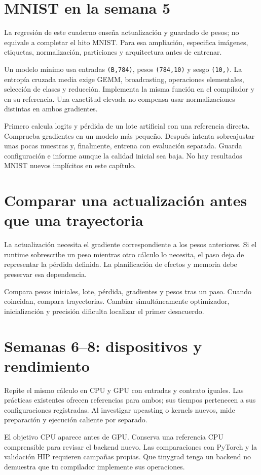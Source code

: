 \documentclass[12pt,a4paper,oneside]{report}
\begin{document}
\section{MNIST en la semana 5}
La regresión de este cuaderno enseña actualización y guardado de pesos; no equivale a completar el hito MNIST. Para esa ampliación, especifica imágenes, etiquetas, normalización, particiones y arquitectura antes de entrenar.

Un modelo mínimo usa entradas \texttt{(B,784)}, pesos \texttt{(784,10)} y sesgo \texttt{(10,)}. La entropía cruzada media exige GEMM, broadcasting, operaciones elementales, selección de clases y reducción. Implementa la misma función en el compilador y en su referencia. Una exactitud elevada no compensa usar normalizaciones distintas en ambos gradientes.

Primero calcula logits y pérdida de un lote artificial con una referencia directa. Comprueba gradientes en un modelo más pequeño. Después intenta sobreajustar unas pocas muestras y, finalmente, entrena con evaluación separada. Guarda configuración e informe aunque la calidad inicial sea baja. No hay resultados MNIST nuevos implícitos en este capítulo.

\section{Comparar una actualización antes que una trayectoria}
La actualización necesita el gradiente correspondiente a los pesos anteriores. Si el runtime sobrescribe un peso mientras otro cálculo lo necesita, el paso deja de representar la pérdida definida. La planificación de efectos y memoria debe preservar esa dependencia.

Compara pesos iniciales, lote, pérdida, gradientes y pesos tras un paso. Cuando coincidan, compara trayectorias. Cambiar simultáneamente optimizador, inicialización y precisión dificulta localizar el primer desacuerdo.

\section{Semanas 6--8: dispositivos y rendimiento}
Repite el mismo cálculo en CPU y GPU con entradas y contrato iguales. Las prácticas existentes ofrecen referencias para ambos; sus tiempos pertenecen a sus configuraciones registradas. Al investigar upcasting o kernels nuevos, mide preparación y ejecución caliente por separado.

El objetivo CPU aparece antes de GPU. Conserva una referencia CPU comprensible para revisar el backend nuevo. Las comparaciones con PyTorch y la validación HIP requieren campañas propias. Que tinygrad tenga un backend no demuestra que tu compilador implemente sus operaciones.
\end{document}
